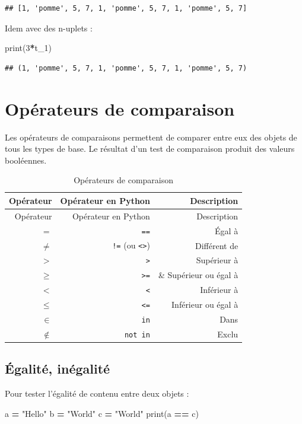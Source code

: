 \documentclass[12pt,]{book}
\newenvironment{Shaded}{\begin{snugshade}}{\end{snugshade}}
\newcommand{\DecValTok}[1]{\textcolor[rgb]{0.00,0.00,0.81}{#1}}
\newcommand{\StringTok}[1]{\textcolor[rgb]{0.31,0.60,0.02}{#1}}
\newcommand{\OperatorTok}[1]{\textcolor[rgb]{0.81,0.36,0.00}{\textbf{#1}}}
\newcommand{\BuiltInTok}[1]{#1}
\newcommand{\NormalTok}[1]{#1}
\numberwithin{equation}{section}
\numberwithin{countremarque}{section}
\begin{document}
\begin{lstlisting}
## [1, 'pomme', 5, 7, 1, 'pomme', 5, 7, 1, 'pomme', 5, 7]
\end{lstlisting}

Idem avec des n-uplets :

\begin{Shaded}
\begin{Highlighting}[]
\BuiltInTok{print}\NormalTok{(}\DecValTok{3}\OperatorTok{*}\NormalTok{t_1)}
\end{Highlighting}
\end{Shaded}

\begin{lstlisting}
## (1, 'pomme', 5, 7, 1, 'pomme', 5, 7, 1, 'pomme', 5, 7)
\end{lstlisting}

\section{Opérateurs de comparaison}\label{operateurs-de-comparaison}

Les opérateurs de comparaisons permettent de comparer entre eux des
objets de tous les types de base. Le résultat d'un test de comparaison
produit des valeurs booléennes.

\begin{longtable}[]{@{}rrr@{}}
\caption{Opérateurs de comparaison}\tabularnewline
\toprule
Opérateur & Opérateur en Python & Description\tabularnewline
\midrule
\endfirsthead
\toprule
Opérateur & Opérateur en Python & Description\tabularnewline
\midrule
\endhead
\(=\) & \texttt{==} & Égal à\tabularnewline
\(\ne\) & \texttt{!=} (ou \texttt{\textless{}\textgreater{}}) &
Différent de\tabularnewline
\(>\) & \texttt{\textgreater{}} & Supérieur à\tabularnewline
\(\geq\) & \texttt{\textgreater{}=} & \& Supérieur ou égal
à\tabularnewline
\(<\) & \texttt{\textless{}} & Inférieur à\tabularnewline
\(\leq\) & \texttt{\textless{}=} & Inférieur ou égal à\tabularnewline
\(\in\) & \texttt{in} & Dans\tabularnewline
\(\notin\) & \texttt{not\ in} & Exclu\tabularnewline
\bottomrule
\end{longtable}

\subsection{Égalité, inégalité}\label{egalite-inegalite}

Pour tester l'égalité de contenu entre deux objets :

\begin{Shaded}
\begin{Highlighting}[]
\NormalTok{a }\OperatorTok{=} \StringTok{"Hello"}
\NormalTok{b }\OperatorTok{=} \StringTok{"World"}
\NormalTok{c }\OperatorTok{=} \StringTok{"World"}
\BuiltInTok{print}\NormalTok{(a }\OperatorTok{==}\NormalTok{ c)}
\end{Highlighting}
\end{Shaded}
\end{document}
